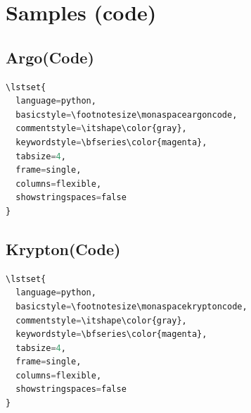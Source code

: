 \documentclass[a4paper]{scrartcl}
\begin{document}




\pagebreak

\section{Samples (code)}

\makeatletter
\renewcommand*\verbatim@nolig@list{}
\makeatother

\subsection{Argo(Code)}

\begin{lstlisting}[language=python,basicstyle=\footnotesize\monaspaceargoncode,commentstyle=\itshape\color{gray},keywordstyle=\bfseries\color{magenta},tabsize=4,frame=single,columns=flexible,showstringspaces=false]
\lstset{
  language=python,
  basicstyle=\footnotesize\monaspaceargoncode,
  commentstyle=\itshape\color{gray},
  keywordstyle=\bfseries\color{magenta},
  tabsize=4,
  frame=single,
  columns=flexible,
  showstringspaces=false
}
\end{lstlisting}





\pagebreak

\subsection{Krypton(Code)}

\begin{lstlisting}[language=python,basicstyle=\footnotesize\monaspacekryptoncode,commentstyle=\itshape\color{gray},keywordstyle=\bfseries\color{magenta},tabsize=4,frame=single,columns=flexible,showstringspaces=false]
\lstset{
  language=python,
  basicstyle=\footnotesize\monaspacekryptoncode,
  commentstyle=\itshape\color{gray},
  keywordstyle=\bfseries\color{magenta},
  tabsize=4,
  frame=single,
  columns=flexible,
  showstringspaces=false
}
\end{lstlisting}
\end{document}
